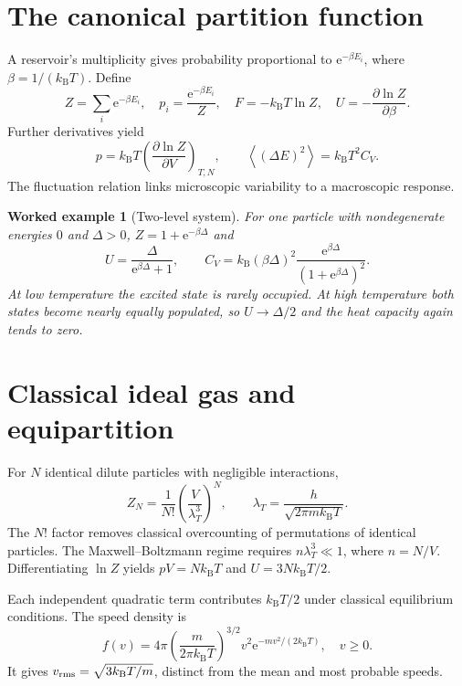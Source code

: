 \documentclass[11pt,oneside]{book}
\newcommand{\ee}{\mathrm{e}}
\newcommand{\avg}[1]{\left\langle #1\right\rangle}
\newcommand{\pd}[2]{\frac{\partial #1}{\partial #2}}
\newcommand{\kb}{k_{\mathrm B}}
\theoremstyle{reviewstyle}
\newtheorem{example}{Worked example}[chapter]
\begin{document}
\section{The canonical partition function}
A reservoir's multiplicity gives probability proportional to $\ee^{-\beta E_i}$, where $\beta=1/(\kb T)$. Define
\begin{equation}
Z=\sum_i\ee^{-\beta E_i},\quad p_i=\frac{\ee^{-\beta E_i}}Z,\quad
F=-\kb T\ln Z,\quad U=-\pd{\ln Z}{\beta}.
\end{equation}
Further derivatives yield
\begin{equation}
p=\kb T\left(\pd{\ln Z}{V}\right)_{T,N},\qquad
\avg{(\Delta E)^2}=\kb T^2C_V.
\end{equation}
The fluctuation relation links microscopic variability to a macroscopic response.
\begin{example}[Two-level system]
For one particle with nondegenerate energies $0$ and $\Delta>0$, $Z=1+\ee^{-\beta\Delta}$ and
\begin{equation}
U=\frac{\Delta}{\ee^{\beta\Delta}+1},\qquad
C_V=\kb(\beta\Delta)^2\frac{\ee^{\beta\Delta}}{(1+\ee^{\beta\Delta})^2}.
\end{equation}
At low temperature the excited state is rarely occupied. At high temperature both states become nearly equally populated, so $U\to\Delta/2$ and the heat capacity again tends to zero.
\end{example}
\section{Classical ideal gas and equipartition}
For $N$ identical dilute particles with negligible interactions,
\begin{equation}
Z_N=\frac1{N!}\left(\frac{V}{\lambda_T^3}\right)^N,\qquad
\lambda_T=\frac{h}{\sqrt{2\pi m\kb T}}.
\end{equation}
The $N!$ factor removes classical overcounting of permutations of identical particles. The Maxwell--Boltzmann regime requires $n\lambda_T^3\ll1$, where $n=N/V$. Differentiating $\ln Z$ yields $pV=N\kb T$ and $U=3N\kb T/2$.

Each independent quadratic term contributes $\kb T/2$ under classical equilibrium conditions. The speed density is
\begin{equation}
f(v)=4\pi\left(\frac{m}{2\pi\kb T}\right)^{3/2}v^2\ee^{-mv^2/(2\kb T)},\quad v\geq0.
\end{equation}
It gives $v_{\rm rms}=\sqrt{3\kb T/m}$, distinct from the mean and most probable speeds.
\end{document}
